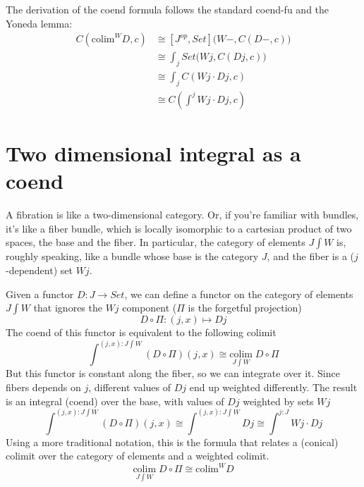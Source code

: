 \documentclass[11pt]{amsart}
\begin{document}
The derivation of the coend formula follows the standard coend-fu and the Yoneda lemma:
\begin{align*}
C(\mbox{colim}^W D, c) & \cong [J^{op}, Set]\big(W-, C(D -, c)\big) \\
 &\cong \int_j Set \big(W j, C(D j, c)\big) \\
 &\cong \int_j C(W j \cdot D j, c) \\
 &\cong C(\int^j W j \cdot D j, c)
\end{align*}

\section{Two dimensional integral as a coend}

A fibration is like a two-dimensional category. Or, if you're familiar with bundles, it's like a fiber bundle, which is locally isomorphic to a cartesian product of two spaces, the base and the fiber. In particular, the category of elements $J \int W$ is, roughly speaking, like a bundle whose base is the category $J$, and the fiber is a ($j$-dependent) set $W j$. 

Given a functor $D \colon J \to Set$, we can define a functor on the category of elements $J \int W$ that ignores the $W j$ component ($\Pi$ is the forgetful projection) 
\[D \circ \Pi \colon (j, x) \mapsto D j\]
The coend of this functor is equivalent to the following colimit
\[\int^{(j, x) \colon J\int W} (D \circ \Pi) (j, x) \cong \underset{J \int W}{\mbox{colim}} \; D \circ \Pi  \]
But this functor is constant along the fiber, so we can integrate over it. Since fibers depends on $j$, different values of $D j$ end up weighted differently. The result is an integral (coend) over the base, with values of $D j$ weighted by sets $W j$
\[\int^{(j, x) \colon J\int W} (D \circ \Pi) (j, x) \cong \int^{(j, x) \colon J\int W} D j  \cong   \int^{j \colon J} W j \cdot D j\]
Using a more traditional notation, this is the formula that relates a (conical) colimit over the category of elements and a weighted colimit.
\[\underset{J \int W}{\mbox{colim}} \; D \circ \Pi  \cong \mbox{colim}^W D\]
\end{document}
